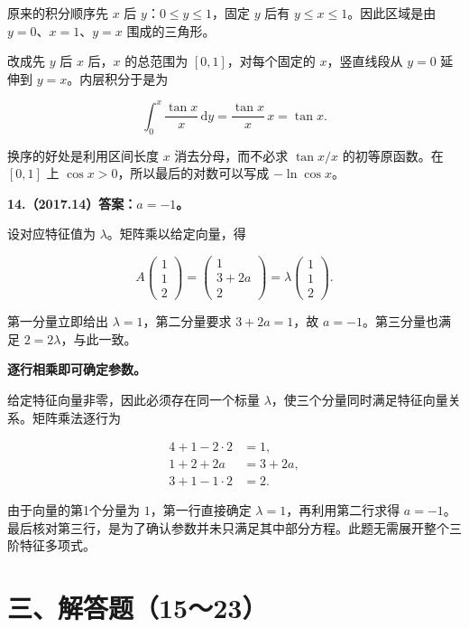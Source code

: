\documentclass[UTF8,11pt,fontset=windows]{ctexart}
\begin{document}
原来的积分顺序先 $x$ 后 $y$：$0\le y\le1$，固定 $y$ 后有 $y\le x\le1$。因此区域是由 $y=0$、$x=1$、$y=x$ 围成的三角形。

改成先 $y$ 后 $x$ 后，$x$ 的总范围为 $[0,1]$，对每个固定的 $x$，竖直线段从 $y=0$ 延伸到 $y=x$。内层积分于是为

$$
\int_0^x\frac{\tan x}{x}\,\mathrm dy
=\frac{\tan x}{x}\,x=\tan x.
$$

换序的好处是利用区间长度 $x$ 消去分母，而不必求 $\tan x/x$ 的初等原函数。在 $[0,1]$ 上 $\cos x>0$，所以最后的对数可以写成 $-\ln\cos x$。

\clearpage

\textbf{14.（2017.14）答案：$a=-1$。}

设对应特征值为 $\lambda$。矩阵乘以给定向量，得

$$
A\begin{pmatrix}1\\1\\2\end{pmatrix}
=\begin{pmatrix}1\\3+2a\\2\end{pmatrix}
=\lambda\begin{pmatrix}1\\1\\2\end{pmatrix}.
$$

第一分量立即给出 $\lambda=1$，第二分量要求 $3+2a=1$，故 $a=-1$。第三分量也满足 $2=2\lambda$，与此一致。

\textbf{逐行相乘即可确定参数。}

给定特征向量非零，因此必须存在同一个标量 $\lambda$，使三个分量同时满足特征向量关系。矩阵乘法逐行为

$$
\begin{aligned}
4+1-2\cdot2&=1,\\
1+2+2a&=3+2a,\\
3+1-1\cdot2&=2.
\end{aligned}
$$

由于向量的第1个分量为 $1$，第一行直接确定 $\lambda=1$，再利用第二行求得 $a=-1$。最后核对第三行，是为了确认参数并未只满足其中部分方程。此题无需展开整个三阶特征多项式。

\clearpage

\section*{三、解答题（15～23）}
\end{document}
